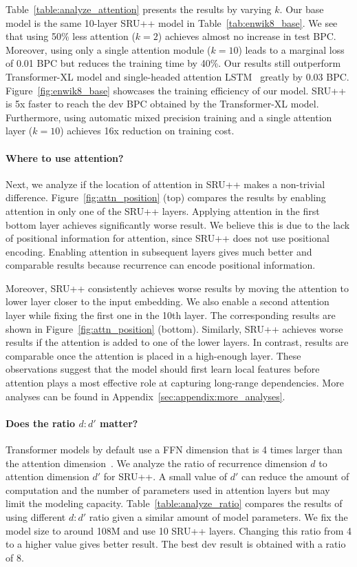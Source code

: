 Table~\ref{table:analyze_attention} presents the results by varying $k$.
Our base model is the same 10-layer SRU++ model in Table~\ref{tab:enwik8_base}.
We see that using 50\% less attention ($k=2$) achieves almost no increase in test BPC.
Moreover, using only a single attention module ($k=10$) leads to a marginal loss of 0.01 BPC but reduces the training time by 40\%. 
Our results still outperform Transformer-XL model and single-headed attention LSTM~\cite{merity2019single} greatly by 0.03 BPC.
Figure~\ref{fig:enwik8_base} showcases the training efficiency of our model.
SRU++ is 5x faster to reach the dev BPC obtained by the Transformer-XL model.
Furthermore, using automatic mixed precision training and a single attention layer ($k=10$) achieves 16x reduction on training cost.

\paragraph{Where to use attention?}
Next, we analyze if the location of attention in SRU++ makes a non-trivial difference.
Figure~\ref{fig:attn_position} (top) compares the results by enabling attention in only one of the SRU++ layers. 
Applying attention in the first bottom layer achieves significantly worse result. 
We believe this is due to the lack of positional information for attention, since SRU++ does not use positional encoding.
Enabling attention in subsequent layers gives much better and comparable results because recurrence can encode positional information.

Moreover, SRU++ consistently achieves worse results by moving the attention to lower layer closer to the input embedding.
We also enable a second attention layer while fixing the first one in the 10th layer.
The corresponding results are shown in Figure~\ref{fig:attn_position} (bottom).
Similarly, SRU++ achieves worse results if the attention is added to one of the lower layers.
In contrast, results are comparable once the attention is placed in a high-enough layer.
These observations suggest that the model should first learn local features before attention plays a most effective role at capturing long-range dependencies.
More analyses can be found in Appendix~\ref{sec:appendix:more_analyses}.

\paragraph{Does the ratio $d:d'$ matter?}
Transformer models by default use a FFN dimension that is 4 times larger than the attention dimension~\cite{vaswani2017attention}.
We analyze the ratio of recurrence dimension $d$ to attention dimension $d'$ for SRU++.
A small value of $d'$ can reduce the amount of computation and the number of parameters used in attention layers but may limit the modeling capacity.
Table~\ref{table:analyze_ratio} compares the results of using different $d:d'$ ratio given a similar amount of model parameters.
We fix the model size to around 108M and use 10 SRU++ layers. 
Changing this ratio from 4 to a higher value gives better result.
The best dev result is obtained with a ratio of 8.

